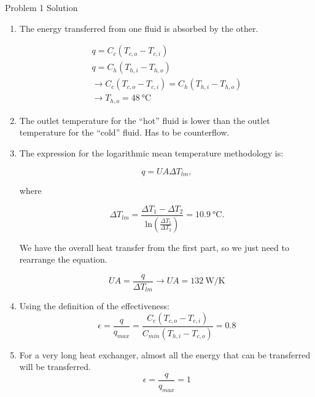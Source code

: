 \documentclass[9pt, aspectratio=169, handout]{beamer}
\begin{document}
\begin{frame}[allowframebreaks]{Problem 1 Solution}
    \begin{enumerate}
        \item The energy transferred from one fluid is absorbed by the other.

        \begin{gather*}
            q = C_c \left( T_{c,o} - T_{c,i} \right) \\
            q = C_h \left( T_{h,i} - T_{h,o} \right) \\ 
            \to C_c \left( T_{c,o} - T_{c,i} \right) = C_h \left( T_{h,i} - T_{h,o} \right) \\
            \to T_{h,o} = \SI{48}{\celsius}
        \end{gather*}

        \item The outlet temperature for the ``hot'' fluid is lower than the outlet temperature for the ``cold'' fluid.
            Has to be counterflow.
        \item The expression for the logarithmic mean temperature methodology is:

            \begin{equation*}
                q = \mathit{UA} \Delta T_{lm},
            \end{equation*}

            where

            \begin{equation*}
                \Delta T_{lm} = \frac{\Delta T_1 - \Delta T_2}{\mathrm{ln} \left( \frac{\Delta T_1}{\Delta T_2} \right)} = \SI{10.9}{\celsius}.
            \end{equation*}

            We have the overall heat transfer from the first part, so we just need to rearrange the equation.

            \begin{equation*}
                \mathit{UA} = \frac{q}{\Delta T_{lm}} \to \mathit{UA} = \SI{132}{\watt\per\kelvin}
            \end{equation*}
        \item Using the definition of the effectiveness:
            \begin{equation*}
                \epsilon = \frac{q}{q_{\mathit{max}}} = \frac{C_c \left( T_{c,o} - T_{c,i}  \right)}{C_{\mathit{min}} \left( T_{h,i} - T_{c,o}  \right)} = 0.8
            \end{equation*}
        \item For a very long heat exchanger, almost all the energy that can be transferred will be transferred.
            \begin{equation*}
                \epsilon = \frac{q}{q_{\mathit{max}}} = 1
            \end{equation*}
    \end{enumerate}
\end{frame}
\end{document}
